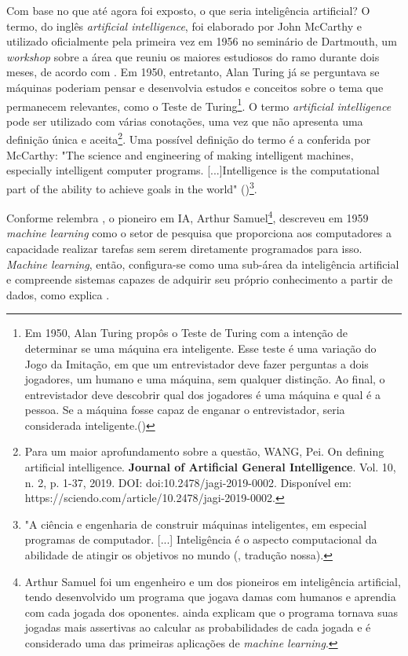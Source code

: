 Com base no que até agora foi exposto, o que seria inteligência artificial? O termo, do
inglês \textit{artificial intelligence}, foi elaborado por John McCarthy e utilizado 
oficialmente pela primeira vez em 1956 no seminário de 
Dartmouth, um \textit{workshop} sobre a área que reuniu os 
maiores estudiosos do ramo durante dois meses, de acordo com \cite{aima}.
Em 1950, entretanto, Alan Turing já se perguntava se máquinas 
poderiam pensar e desenvolvia estudos e conceitos sobre o tema que permanecem relevantes,
como o Teste de Turing\footnote{Em 1950, Alan Turing propôs o 
Teste de Turing com a intenção de determinar se uma máquina era inteligente. Esse teste é uma variação 
do Jogo da Imitação, em que um entrevistador deve fazer perguntas a dois jogadores, um 
humano e uma máquina, sem qualquer distinção. Ao final, o entrevistador deve
descobrir qual dos jogadores é uma máquina e qual é a pessoa. Se 
a máquina fosse capaz de enganar o entrevistador, seria considerada
inteligente.(\cite{turing})}.
O termo \textit{artificial intelligence} 
pode ser utilizado com
várias conotações, uma vez que não apresenta uma definição 
única e aceita\footnote{Para um maior aprofundamento sobre a questão, WANG, Pei. On defining artificial intelligence. \textbf{Journal of Artificial General Intelligence}. Vol. 10, n. 2, p. 1-37, 2019. DOI: doi:10.2478/jagi-2019-0002. Disponível em: https://sciendo.com/article/10.2478/jagi-2019-0002. }. Uma possível definição do termo é a conferida por McCarthy: "The science and engineering of making intelligent machines, especially intelligent computer programs. [...]Intelligence is the computational part of the ability to achieve goals in the world" (\citealt[][p.2]{what-is-ai})\footnote{"A ciência e engenharia de construir máquinas inteligentes, em especial programas de computador. [...] Inteligência é o aspecto computacional da abilidade de atingir os objetivos no mundo (\citealt[][p.2]{what-is-ai}, tradução nossa).}.


Conforme relembra \citet{dl-oreilly}, o pioneiro em IA, Arthur Samuel\footnote{Arthur Samuel
foi um engenheiro e um dos pioneiros em inteligência artificial,
tendo desenvolvido um programa que jogava damas com humanos e aprendia
com cada jogada dos oponentes. \citet{dl-oreilly} ainda explicam que o programa tornava suas jogadas mais 
assertivas ao calcular as probabilidades de cada jogada e é 
considerado uma das primeiras aplicações de \textit{machine learning}.
}, descreveu em 1959
\textit{machine learning} como o setor de pesquisa que proporciona aos computadores a capacidade realizar tarefas sem serem diretamente programados para isso. \textit{Machine learning}, 
então, configura-se como uma 
sub-área da inteligência artificial e compreende sistemas capazes de adquirir seu próprio conhecimento a partir de dados, como explica \citet{Goodfellow-et-al-2016}.

